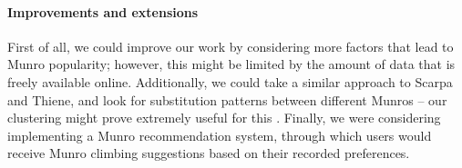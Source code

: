 \documentclass[11pt,a4paper]{article}
\begin{document}
\paragraph{Improvements and extensions}
First of all, we could improve our work by considering more factors that lead to Munro popularity; however, this might be limited by the amount of data that is freely available online. Additionally, we could take a similar approach to Scarpa and Thiene, and look for substitution patterns between different Munros – our clustering might prove extremely useful for this \cite{HitA}. Finally, we were considering implementing a Munro recommendation system, through which users would receive Munro climbing suggestions based on their recorded preferences.


\end{document}
